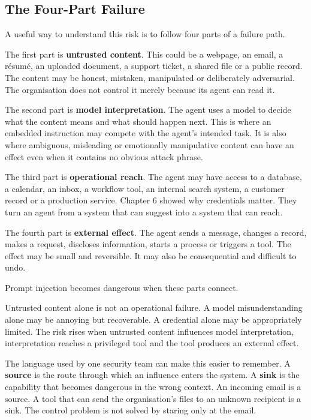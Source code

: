 \subsection{The Four-Part Failure}\label{the-four-part-failure}

A useful way to understand this risk is to follow four parts of a
failure path.

The first part is \textbf{untrusted content}. This could be a webpage,
an email, a résumé, an uploaded document, a support ticket, a shared
file or a public record. The content may be honest, mistaken,
manipulated or deliberately adversarial. The organisation does not
control it merely because its agent can read it.

The second part is \textbf{model interpretation}. The agent uses a model
to decide what the content means and what should happen next. This is
where an embedded instruction may compete with the agent's intended
task. It is also where ambiguous, misleading or emotionally manipulative
content can have an effect even when it contains no obvious attack
phrase.

The third part is \textbf{operational reach}. The agent may have access
to a database, a calendar, an inbox, a workflow tool, an internal search
system, a customer record or a production service. Chapter 6 showed why
credentials matter. They turn an agent from a system that can suggest
into a system that can reach.

The fourth part is \textbf{external effect}. The agent sends a message,
changes a record, makes a request, discloses information, starts a
process or triggers a tool. The effect may be small and reversible. It
may also be consequential and difficult to undo.

Prompt injection becomes dangerous when these parts connect.

Untrusted content alone is not an operational failure. A model
misunderstanding alone may be annoying but recoverable. A credential
alone may be appropriately limited. The risk rises when untrusted
content influences model interpretation, interpretation reaches a
privileged tool and the tool produces an external effect.

The language used by one security team can make this easier to remember.
A \textbf{source} is the route through which an influence enters the
system. A \textbf{sink} is the capability that becomes dangerous in the
wrong context. An incoming email is a source. A tool that can send the
organisation's files to an unknown recipient is a sink. The control
problem is not solved by staring only at the email.

